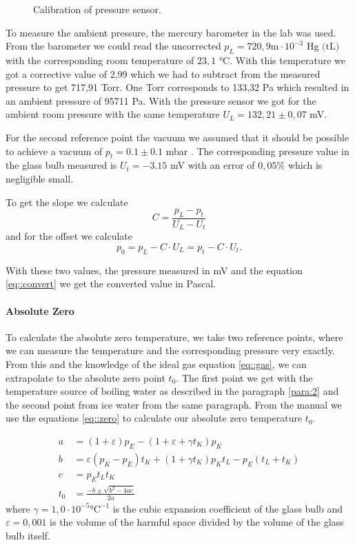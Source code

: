 \begin{figure}[h!]
	\begin{center}
		
	\end{center}
	\caption{Calibration of pressure sensor.}\label{fig::cali}
\end{figure}

To measure the ambient pressure, the mercury barometer in the lab was used.
From the barometer we could read the uncorrected $p_L = 720,9$$\si{\m} \cdot 10^{-3} \text{  Hg (tL)}$ with the corresponding room temperature of $23,1$ $\si{\degreeCelsius}$. 
With this temperature we got a corrective value of 2,99 which we had to subtract from the measured pressure to get 717,91 Torr.
One Torr corresponds to 133,32 Pa which resulted in an ambient pressure of 95711 Pa.
With the pressure sensor we got for the ambient room pressure with the same temperature $U_L = 132,21 \pm 0,07$ \si{\milli\volt}.


For the second reference point the vacuum we assumed that it should be possible to achieve a vacuum of $p_t = 0.1\pm 0.1$ mbar \cite{manual}. 
The corresponding pressure value in the glass bulb measured is $ U_t = -3.15$ \si{\milli\volt} with an error of $0,05\%$ which is negligible small.


To get the slope we calculate
\[
C= \frac{p_L -p_t}{U_L -U_t}
\]
and for the offset we calculate
\[
p_0= p_L-C\cdot U_L = p_t-C\cdot U_t.
\]

With these two values, the pressure measured in \si{\milli\volt} and the equation \ref{eq::convert} we get the converted value in Pascal.


\paragraph{Absolute Zero} To calculate the absolute zero temperature, we take two reference points, where we can measure the temperature and the corresponding pressure very exactly. 
From this and the knowledge of the ideal gas equation \ref{eq::gas}, we can extrapolate to the absolute zero point $t_0$.
The first point we get with the temperature source of boiling water as described in the paragraph \ref{para:2} and the second point from ice water from the same paragraph.
From the manual\cite{manual} we use the equations \ref{eq::zero} to calculate our absolute zero temperature $t_0$.

\begin{equation}
\begin{aligned}
a &=(1+\varepsilon) p_{E}-\left(1+\varepsilon+\gamma t_{K}\right) p_{K} \\
b &=\varepsilon\left(p_{K}-p_{E}\right) t_{K}+\left(1+\gamma t_{K}\right) p_{K} t_{L}-p_{E}\left(t_{L}+t_{K}\right) \\
c &=p_{E} t_{L} t_{K} \\
t_{0} &=\frac{-b \pm \sqrt{b^{2}-4 a c}}{2 a}
\end{aligned}
\label{eq::zero}
\end{equation}
where $\gamma = 1,0 \cdot 10^{-5} \si{\degreeCelsius}^{-1}$ is the cubic expansion coefficient of the glass bulb and $\varepsilon = 0,001$ is the volume of the harmful space divided by the volume of the glass bulb itself.


